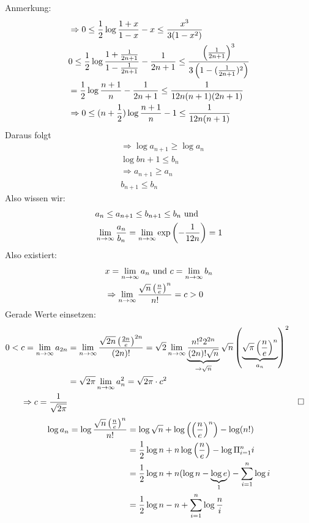 Anmerkung:
\begin{align*}
    &\Rightarrow 0 \leq \frac{1}{2} \log \frac{1 +x}{1-x} - x \leq \frac{x^3}{3(1- x^2)}\\
    &0 \leq \frac{1}{2} \log \frac{1 + \frac{1}{2n+1}}{1 - \frac{1}{2n+1}} - \frac{1}{2n+1} \leq \frac{\left(\frac{1}{2n+1}\right)^3}{3\left(1 - (\frac{1}{2n+1})^2\right)}\\
    &= \frac{1}{2} \log \frac{n+1}{n} - \frac{1}{2n+1} \leq \frac{1}{12n(n+1)(2n+1)}\\
    &\Rightarrow 0 \leq (n + \frac{1}{2}) \log \frac{n+1}{n} - 1 \leq \frac{1}{12n(n+1)}
\end{align*}
Daraus folgt
\begin{align*}
    &\Rightarrow \log a_{n+1} \geq \log a_n\\
    &\log b{n+1} \leq b_n\\
    &\Rightarrow a_{n+1} \geq a_n\\
    &b_{n+1} \leq b_n
\end{align*}
Also wissen wir:
\begin{align*}
    &a_n \leq a_{n+1} \leq b_{n+1} \leq b_n \text{ und }\\ &\lim_{n \rightarrow \infty} \frac{a_n}{b_n} = \lim_{n \rightarrow \infty} \exp\left( - \frac{1}{12n}\right) = 1
\end{align*}
Also existiert:
\begin{align*}
    &x = \lim_{n \rightarrow \infty} a_n \text{ und } c = \lim_{n \rightarrow \infty} b_n\\
    &\Rightarrow \lim_{n \rightarrow \infty} \frac{\sqrt{n} \left(\frac{n}{e}\right)^n}{n!} = c > 0
\end{align*}
Gerade Werte einsetzen:
\begin{align*}
    0 < c = \lim_{n \rightarrow \infty} a_{2n} &= \lim_{n \rightarrow \infty} \frac{\sqrt{2n}\left(\frac{2n}{e}\right)^{2n}}{(2n)!} = \sqrt{2} \lim_{n \rightarrow \infty} \underbrace{\frac{n!^22^{2n}}{(2n)! \sqrt{n}}}_{\rightarrow \sqrt{n}} \sqrt{n} \left( \underbrace{\sqrt{\pi} \left(\frac{n}{e}\right)^n}_{a_n}\right)^2\\
    &= \sqrt{2\pi} \lim_{n \rightarrow \infty} a^2_n = \sqrt{2\pi} \cdot c^2\\
    \Rightarrow c = \frac{1}{\sqrt{2\pi}} &&&\square
\end{align*}
\newcommand{\ndurche}{\left(\frac{n}{e}\right)}
\renewcommand{\summeeinsbisn}{\sum_{i = 1}^{n}}
\begin{align*}
    \log a_n = \log \frac{\sqrt{n} \ndurche^n}{n!} &= \log \sqrt{n} + \log \left(\ndurche^n\right) - \log (n!)\\
    &= \frac{1}{2} \log n + n \log \ndurche - \log \pivoneinsbisn i\\
    &= \frac{1}{2} \log n + n(\log n  - \underbrace{\log e}_{1}) - \sum_{i = 1}^n \log i\\
    &= \frac{1}{2} \log n - n + \sum_{i=1}^{n} \log \frac{n}{i}
\end{align*}

